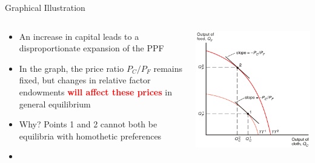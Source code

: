 \documentclass[10pt,hyperref={CJKbookmarks=true},xcolor=dvipsnames,aspectratio=169]{beamer}
\begin{document}
\begin{frame}{Graphical Illustration}


\begin{columns}[onlytextwidth]
\begin{column}{0.5\textwidth}
\begin{itemize}
\item An increase in capital leads to a disproportionate expansion of the
PPF 
\item In the graph, the price ratio $P_{C}/P_{F}$ remains fixed, but changes
in relative factor endowments \textbf{\textcolor{red}{will affect
these prices}} in general equilibrium 
\item Why? Points 1 and 2 cannot both be equilibria with homothetic preferences 
\item {}
\end{itemize}

\end{column}
\begin{column}{0.5\textwidth}
\includegraphics[width=0.8\columnwidth]{fig/ho/lec5-10}
\end{column}
\end{columns}

\end{frame}
\end{document}
